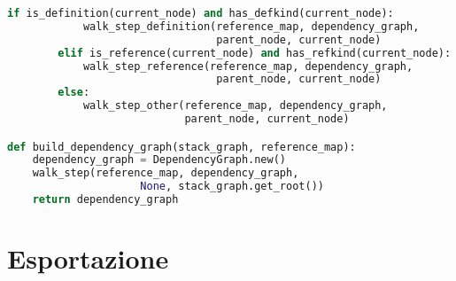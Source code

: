 \begin{lstlisting}[language=Python, caption=pseudocodice]
        if is_definition(current_node) and has_defkind(current_node):
            walk_step_definition(reference_map, dependency_graph,
                                 parent_node, current_node)
        elif is_reference(current_node) and has_refkind(current_node):
            walk_step_reference(reference_map, dependency_graph,
                                 parent_node, current_node)
        else:
            walk_step_other(reference_map, dependency_graph,
                            parent_node, current_node)

def build_dependency_graph(stack_graph, reference_map):
    dependency_graph = DependencyGraph.new()
    walk_step(reference_map, dependency_graph,
                     None, stack_graph.get_root())
    return dependency_graph
\end{lstlisting}

\section{Esportazione}

